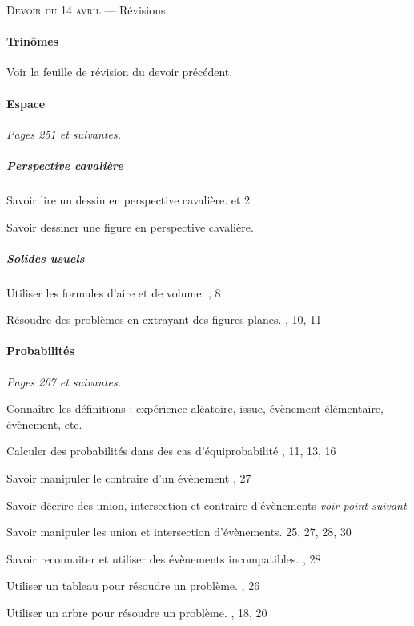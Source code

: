 \documentclass[10pt]{article}
\begin{document}
\begin{center}
  \textsc{Devoir du 14 avril} --- Révisions
\end{center}

\paragraph{Trinômes}
  Voir la feuille de révision du devoir précédent.

\paragraph{Espace}

\emph{Pages 251 et suivantes.}

\subparagraph{Perspective cavalière}

\begin{compactitem}
  \item Savoir lire un dessin en perspective cavalière.  et 2
  \item Savoir dessiner une figure en perspective cavalière. 
\end{compactitem}

\subparagraph{Solides usuels}

\begin{compactitem}
  \item Utiliser les formules d'aire et de volume. , 8
  \item Résoudre des problèmes en extrayant des figures planes. , 10, 11
\end{compactitem}

\paragraph{Probabilités}

\emph{Pages 207 et suivantes.}

\begin{compactitem}
  \item Connaître les définitions : expérience aléatoire, issue, évènement élémentaire, évènement, etc.
  \item Calculer des probabilités dans des cas d'équiprobabilité , 11, 13, 16
  \item Savoir manipuler le contraire d'un évènement , 27
  \item Savoir décrire des union, intersection et contraire d'évènements \dotfill \emph{voir point suivant}
  \item Savoir manipuler les union et intersection d'évènements. \hfill 25, 27, 28, 30
  \item Savoir reconnaiter et utiliser des évènements incompatibles. , 28
  \item Utiliser un tableau pour résoudre un problème. , 26
  \item Utiliser un arbre pour résoudre un problème. , 18, 20
\end{compactitem}
\end{document}
